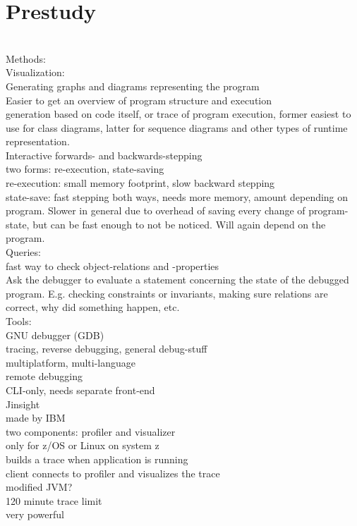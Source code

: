 \section{Prestudy}\label{Prestudy}
~\\

Methods:\\

Visualization:\\
	Generating graphs and diagrams representing the program\\
	Easier to get an overview of program structure and execution\\
	generation based on code itself, or trace of program execution, former easiest to use for class diagrams, latter for sequence diagrams and other types of runtime representation.\\

Interactive forwards- and backwards-stepping\\
	two forms: re-execution, state-saving\\
	re-execution: small memory footprint,  slow backward stepping\\
	state-save: fast stepping both ways, needs more memory, amount depending on program. Slower in general due to overhead of saving every change of program-state, but can be fast enough to not be noticed. Will again depend on the program.\\

Queries:\\
	fast way to check object-relations and -properties\\
	Ask the debugger to evaluate a statement concerning the state of the debugged program. E.g. checking constraints or invariants, making sure relations are correct, why did something happen, etc.\\

Tools:\\

GNU debugger (GDB)\\
	tracing, reverse debugging, general debug-stuff\\
	multiplatform, multi-language\\
	remote debugging\\
	CLI-only, needs separate front-end\\

Jinsight\\
	made by IBM\\
	two components: profiler and visualizer\\
	only for z/OS or Linux on system z\\
	builds a trace when application is running\\
	client connects to profiler and visualizes the trace\\
	modified JVM?\\
	120 minute trace limit\\
	very powerful\\


